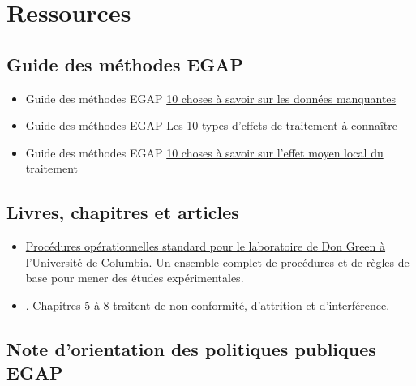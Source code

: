 \documentclass[12pt,]{book}
\providecommand{\tightlist}{%
  \setlength{\itemsep}{0pt}\setlength{\parskip}{0pt}}
\begin{document}
\hypertarget{ressources-7}{%
\section{Ressources}\label{ressources-7}}

\hypertarget{guide-des-muxe9thodes-egap-7}{%
\subsection{Guide des méthodes EGAP}\label{guide-des-muxe9thodes-egap-7}}

\begin{itemize}
\item
  Guide des méthodes EGAP \href{https://egap.org/resource/10-things-to-know-about-missing-data/}{10 choses à savoir sur les données manquantes}
\item
  Guide des méthodes EGAP \href{https://egap.org/resource/10-types-of-treatment-effect-you-should-know-about/}{Les 10 types d'effets de traitement à connaître}
\item
  Guide des méthodes EGAP \href{https://egap.org/resource/10-things-to-know-about-the-local-average-treatment-effect/}{10 choses à savoir sur l'effet moyen local du traitement}
\end{itemize}

\hypertarget{livres-chapitres-et-articles-5}{%
\subsection{Livres, chapitres et articles}\label{livres-chapitres-et-articles-5}}

\begin{itemize}
\tightlist
\item
  \href{https://github.com/acoppock/Green-Lab-SOP}{Procédures opérationnelles standard pour le laboratoire de Don Green à l'Université de Columbia}. Un ensemble complet de procédures et de règles de base pour mener des études expérimentales.
\item
  \autocite{gerber_field_2012}. Chapitres 5 à 8 traitent de non-conformité, d'attrition et d'interférence.
\end{itemize}

\hypertarget{note-dorientation-des-politiques-publiques-egap}{%
\subsection{Note d'orientation des politiques publiques EGAP}\label{note-dorientation-des-politiques-publiques-egap}}
\end{document}

